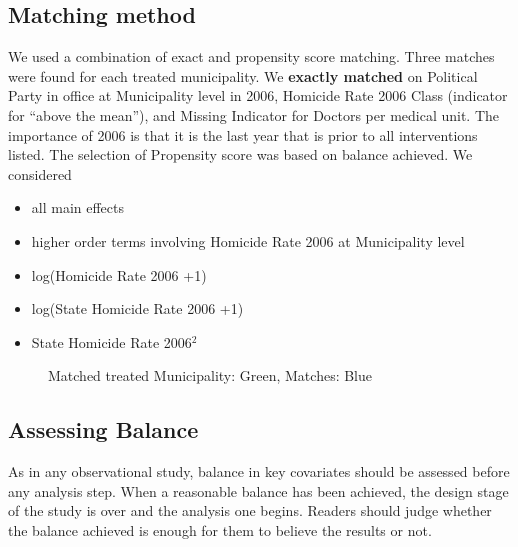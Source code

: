 \documentclass{article}[11 pt]
\begin{document}
\subsection{Matching method}
We used a combination of exact and propensity score matching. Three matches were found for each treated municipality. We \textbf{exactly matched} on Political Party in office at Municipality level in 2006, Homicide Rate 2006 Class (indicator for ``above the mean''), and Missing Indicator for Doctors per medical unit. The importance of 2006 is that it is the last year that is prior to all interventions listed. The selection of Propensity score was based on balance achieved. We considered
\begin{itemize}
	 \item all main effects
	\item higher order terms involving Homicide Rate 2006 at Municipality level
	\item log(Homicide Rate 2006 +1)
	\item log(State Homicide Rate 2006 +1)
	\item State Homicide Rate 2006$^2$
\end{itemize}

 

\begin{figure}[htdp]
    \centering
{}
	\hspace{2cm}
\caption{Matched treated Municipality: Green, Matches: Blue}	
\end{figure}	


\subsection{Assessing Balance}
As in any observational study, balance in key covariates should be assessed before any analysis step. When a reasonable balance has been achieved, the design stage of the study is over and the analysis one begins. Readers should judge whether the balance achieved is enough for them to believe the results or not.  
\end{document}
